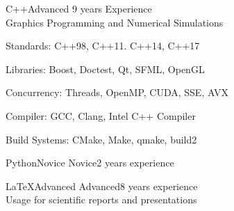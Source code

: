 \documentclass[a4paper,10pt]{cv}
\begin{document}
        \begin{cvLongSkillItem}{C++}{Advanced}
          \hfill 9 years Experience \\[1pt]
          Graphics Programming and Numerical Simulations
          \begin{cvItemize}
            \item Standards: C++98, C++11. C++14, C++17
            \item Libraries: Boost, Doctest, Qt, SFML, OpenGL
            \item Concurrency: Threads, OpenMP, CUDA, SSE, AVX
            \item Compiler: GCC, Clang, Intel C++ Compiler
            \item Build Systems: CMake, Make, qmake, build2
          \end{cvItemize}
        \end{cvLongSkillItem}
      \begin{multicols}{2}
      \vspace{-1.8em}
        \begin{cvSkillItem}{Python}{Novice}
          Novice\hfill 2 years experience
        \end{cvSkillItem}
        \begin{cvSkillItem}{LaTeX}{Advanced}
          Advanced\hfill 8 years experience\\[1pt]
          Usage for scientific reports and presentations
        \end{cvSkillItem}
      \end{multicols}
\end{document}
